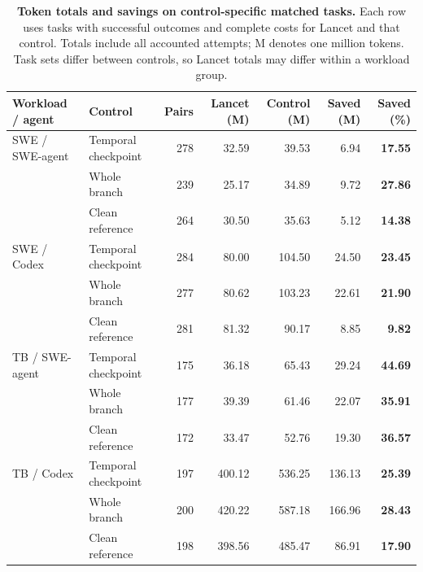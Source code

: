 \begin{table}[t]
\centering
\caption{\textbf{Token totals and savings on control-specific matched tasks.}
Each row uses tasks with successful outcomes and complete costs for Lancet and that control.
Totals include all accounted attempts; M denotes one million tokens.
Task sets differ between controls, so Lancet totals may differ within a workload group.}
\label{tab:realworld-token-savings}
\footnotesize
\setlength{\tabcolsep}{4pt}
\begin{tabular*}{\textwidth}{@{\extracolsep{\fill}}llrrrrr@{}}
\toprule
Workload / agent & Control & Pairs & Lancet (M) & Control (M) & Saved (M) & Saved (\%) \\
\midrule
SWE / SWE-agent & Temporal checkpoint & 278 & 32.59 & 39.53 & 6.94 & \textbf{17.55} \\
 & Whole branch & 239 & 25.17 & 34.89 & 9.72 & \textbf{27.86} \\
 & Clean reference & 264 & 30.50 & 35.63 & 5.12 & \textbf{14.38} \\
\midrule
SWE / Codex & Temporal checkpoint & 284 & 80.00 & 104.50 & 24.50 & \textbf{23.45} \\
 & Whole branch & 277 & 80.62 & 103.23 & 22.61 & \textbf{21.90} \\
 & Clean reference & 281 & 81.32 & 90.17 & 8.85 & \textbf{9.82} \\
\midrule
TB / SWE-agent & Temporal checkpoint & 175 & 36.18 & 65.43 & 29.24 & \textbf{44.69} \\
 & Whole branch & 177 & 39.39 & 61.46 & 22.07 & \textbf{35.91} \\
 & Clean reference & 172 & 33.47 & 52.76 & 19.30 & \textbf{36.57} \\
\midrule
TB / Codex & Temporal checkpoint & 197 & 400.12 & 536.25 & 136.13 & \textbf{25.39} \\
 & Whole branch & 200 & 420.22 & 587.18 & 166.96 & \textbf{28.43} \\
 & Clean reference & 198 & 398.56 & 485.47 & 86.91 & \textbf{17.90} \\
\bottomrule
\end{tabular*}
\end{table}
